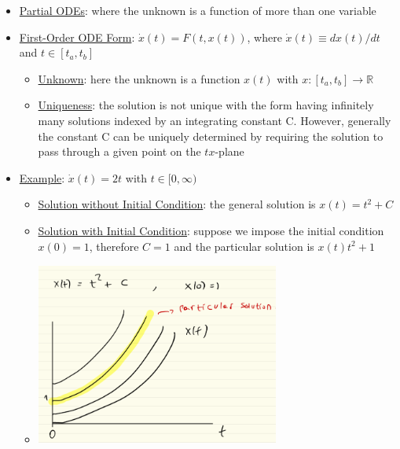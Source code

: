 \documentclass{article}
\begin{document}
\begin{itemize}
    \item \underline{Partial ODEs}: where the unknown is a function of more than one variable
    \item  \underline{First-Order ODE Form}: $\dot{x}(t) = F(t, x(t))$, where $\dot{x}(t) \equiv dx(t)/dt$ and $t \in [t_{a}, t_{b}]$
    \begin{itemize}
        \item \underline{Unknown}: here the unknown is a function $x(t)$ with $x: [t_{a}, t_{b}] \rightarrow \mathbb{R}$
        \item  \underline{Uniqueness}: the solution is not unique with the form having infinitely many solutions indexed by an integrating constant C. However, generally the constant C can be uniquely determined by requiring the solution to pass through a given point on the $tx$-plane
    \end{itemize}
    \item  \underline{Example}: $\dot{x}(t) = 2t$ with $t \in [0,\infty)$
    \begin{itemize}
        \item \underline{Solution without Initial Condition}: the general solution is $x(t) = t^{2} + C$
        \item  \underline{Solution with Initial Condition}: suppose we impose the initial condition $x(0) = 1$, therefore $C=1$ and the particular solution is $x(t) t^{2} + 1$
        \item \includegraphics[width=8cm, height=6cm]{pic5}
    \end{itemize}
\end{itemize}
\end{document}
